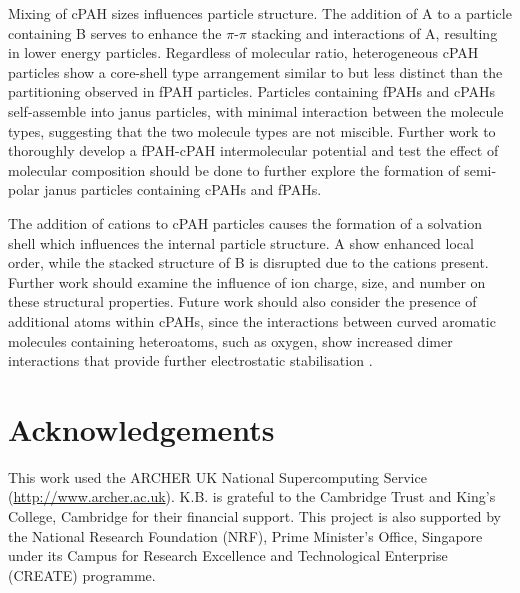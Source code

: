Mixing of cPAH sizes influences particle structure. The addition of A to a particle containing B serves to enhance the $\pi$-$\pi$ stacking and interactions of A, resulting in lower energy particles. %
Regardless of molecular ratio, heterogeneous cPAH particles show a core-shell type arrangement similar to but less distinct than the partitioning observed in fPAH particles. Particles containing fPAHs and cPAHs self-assemble into janus particles, with minimal interaction between the molecule types, suggesting that the two molecule types are not miscible. Further work to thoroughly develop a fPAH-cPAH intermolecular potential and test the effect of molecular composition should be done to further explore the formation of semi-polar janus particles containing cPAHs and fPAHs. 

The addition of cations to cPAH particles causes the formation of a solvation shell which influences the internal particle structure. A show enhanced local order, while the stacked structure of B is disrupted due to the cations present. Further work should examine the influence of ion charge, size, and number on these structural properties. Future work should also consider the presence of additional atoms within cPAHs, since the interactions between curved aromatic molecules containing heteroatoms, such as oxygen, show increased dimer interactions that provide further electrostatic stabilisation \cite{Cabaleiro-Lago2018}.  


\section*{Acknowledgements}
This work used the ARCHER UK National Supercomputing Service (\url{http://www.archer.ac.uk}).
K.B. is grateful to the Cambridge Trust and King's College, Cambridge for their financial support.
This project is also supported by the National Research Foundation (NRF), Prime Minister's Office, Singapore under its Campus for Research Excellence and Technological Enterprise (CREATE) programme.
